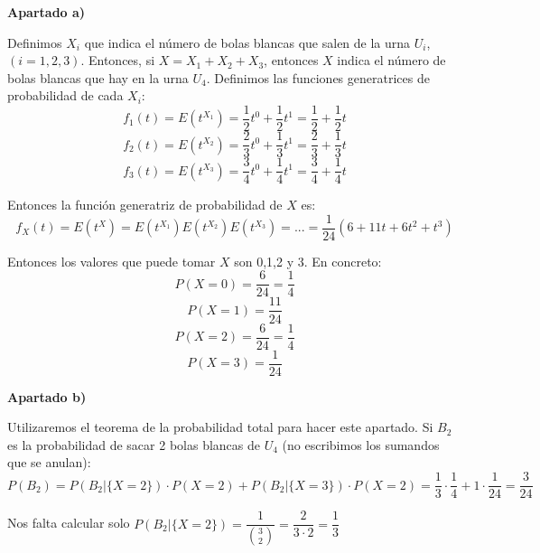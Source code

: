 \documentclass[openany]{book}
\begin{document}
\begin{exercise}
    $  $\\ 
    \begin{flushright}
        \textbf{Apartado a)}
    \end{flushright}
    
    Definimos $ X_i $ que indica el número de bolas blancas que salen de la urna $ U_i $, $ (i=1,2,3) $. Entonces, si $ X = X_1+X_2+X_3 $, entonces $ X $ indica el número de bolas blancas que hay en la urna $ U_4 $. Definimos las funciones generatrices de probabilidad de cada $ X_i $:
    $$ f_{1}(t) = E(t^{X_1}) = \dfrac{1}{2}t^{0} + \dfrac{1}{2}t^{1} = \dfrac{1}{2} +\dfrac{1}{2}t $$
    $$ f_{2}(t) = E(t^{X_2}) = \dfrac{2}{3}t^{0} + \dfrac{1}{3}t^{1} =\dfrac{2}{3} + \dfrac{1}{3}t$$
    $$ f_{3}(t) = E(t^{X_3}) = \dfrac{3}{4}t^{0} + \dfrac{1}{4}t^{1} = \dfrac{3}{4}+\dfrac{1}{4}t$$

    Entonces la función generatriz de probabilidad de $ X $ es:
    $$ f_{X}(t) = E(t^{X}) = E(t^{X_1})E(t^{X_2})E(t^{X_3}) = ... = \dfrac{1}{24}(6+11t+6t^2+t^3) $$
    
    Entonces los valores que puede tomar $ X $ son 0,1,2 y 3. En concreto:
    $$ P(X=0) = \dfrac{6}{24} = \dfrac{1}{4} $$
    $$ P(X=1) = \dfrac{11}{24} $$
    $$ P(X=2) = \dfrac{6}{24} = \dfrac{1}{4} $$
    $$ P(X=3) = \dfrac{1}{24} $$

\begin{flushright}
    \textbf{Apartado b)}
\end{flushright}

Utilizaremos el teorema de la probabilidad total para hacer este apartado. Si $ B_2 $ es la probabilidad de sacar 2 bolas blancas de $ U_4 $ (no escribimos los sumandos que se anulan):
$$ P(B_2) = P(B_2|\{X=2\}) \cdot P(X=2)+P(B_2|\{X=3\}) \cdot P(X=2) = \dfrac{1}{3}\cdot \dfrac{1}{4} + 1\cdot \dfrac{1}{24} = \dfrac{3}{24}$$

Nos falta calcular solo $ P(B_2|\{X=2\}) = \dfrac{1}{\binom{3}{2}} = \dfrac{2}{3\cdot 2} = \dfrac{1}{3} $

\end{exercise}
\end{document}
